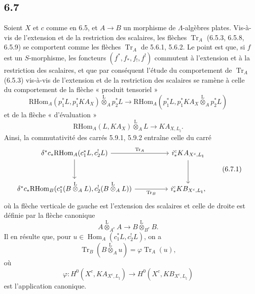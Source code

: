 \documentclass[11pt]{article}
\DeclareMathOperator{\Hom}{Hom}
\providecommand{\RHom}{\mathrm{RHom}}
\providecommand{\Tr}{\operatorname{Tr}}
\providecommand{\Tr}{\operatorname{Tr}}
\providecommand{\lten}{\overset{\mathrm L}{\otimes}}
\providecommand{\Tr}{\operatorname{Tr}}
\providecommand{\RHom}{\mathrm{RHom}}
\providecommand{\Hom}{\operatorname{Hom}}
\providecommand{\lten}{\overset{\mathrm L}{\otimes}}
\providecommand{\RHom}{\mathrm R\mathcal{H}om}
\providecommand{\lten}{\overset{\mathrm L}{\otimes}}
\providecommand{\Tr}{\operatorname{Tr}}
\providecommand{\lten}{\overset{\mathrm L}{\otimes}}
\providecommand{\lten}{\overset{\mathrm L}{\otimes}}
\providecommand{\lten}{\overset{\mathrm L}{\otimes}}
\begin{document}
\subsection*{6.7}
Soient $X$ et $c$ comme en 6.5, et $A\to B$ un morphisme de $\Lambda$-algèbres plates. Vis-à-vis de l'extension et de la restriction des scalaires, les flèches $\Tr_A$ (6.5.3, 6.5.8, 6.5.9) se comportent comme les flèches $\Tr_A$ de 5.6.1, 5.6.2. Le point est que, si $f$ est un $S$-morphisme, les foncteurs $(f^*,f_*,f_!,f^!)$ commutent à l'extension et à la restriction des scalaires, et que par conséquent l'étude du comportement de $\Tr_A$ (6.5.3) vis-à-vis de l'extension et de la restriction des scalaires se ramène à celle du comportement de la flèche « produit tensoriel »
\[
\RHom_A(p_1^*L,p_1^*KA_X)\lten_Ap_2^*L
\longrightarrow
\RHom_A(p_1^*L,p_1^*KA_X\lten_Ap_2^*L)
\]
et de la flèche « d'évaluation »
\[
\RHom_A(L,KA_X)\lten_A L\longrightarrow KA_{X,L_{\natural}}.
\]
Ainsi, la commutativité des carrés 5.9.1, 5.9.2 entraîne celle du carré
\begin{equation}
\begin{tikzcd}[column sep=huge,row sep=large]
\delta^*c_*\RHom_A(c_1^*L,c_2^!L) \arrow[r,"\Tr_A"] \arrow[d]
& i_*^cKA_{X^c,L_{\natural}} \arrow[d]\\
\delta^*c_*\RHom_B(c_1^*(B\lten_A L),c_2^!(B\lten_A L)) \arrow[r,"\Tr_B"']
& i_*^cKB_{X^c,L_{\natural}},
\end{tikzcd}
\tag{6.7.1}
\end{equation}
où la flèche verticale de gauche est l'extension des scalaires et celle de droite est définie par la flèche canonique
\[
A\lten_{A^e}A\longrightarrow B\lten_{B^e}B.
\]
Il en résulte que, pour $u\in\Hom_A(c_1^*L,c_2^!L)$, on a
\begin{equation}
\Tr_B(B\lten_Au)=\varphi\Tr_A(u),
\tag{6.7.2}
\end{equation}
où
\[
\varphi:H^0(X^c,KA_{X^c,L_{\natural}})\longrightarrow H^0(X^c,KB_{X^c,L_{\natural}})
\]
est l'application canonique.
\end{document}
